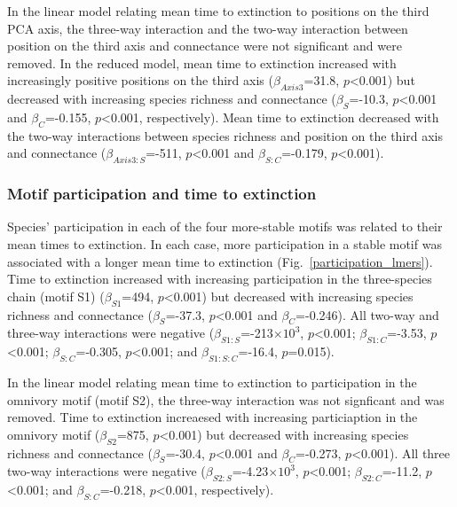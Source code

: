 \documentclass[12pt]{article}
\begin{document}
			In the linear model relating mean time to extinction to positions on the third PCA axis, the three-way interaction and the two-way interaction between position on the third axis and connectance were not significant and were removed. In the reduced model, mean time to extinction increased with increasingly positive positions on the third axis ($\beta_{Axis3}$=31.8, $p$\textless0.001) but decreased with increasing species richness and connectance ($\beta_{S}$=-10.3, $p$\textless0.001 and $\beta_{C}$=-0.155, $p$\textless0.001, respectively). Mean time to extinction decreased with the two-way interactions between species richness and position on the third axis and connectance ($\beta_{Axis3:S}$=-511, $p$\textless0.001 and $\beta_{S:C}$=-0.179, $p$\textless0.001).


		\subsubsection*{Motif participation and time to extinction}

			Species' participation in each of the four more-stable motifs was related to their mean times to extinction. In each case, more participation in a stable motif was associated with a longer mean time to extinction (Fig.~\ref{participation_lmers}).
			Time to extinction increased with increasing participation in the three-species chain (motif S1) ($\beta_{S1}$=494, $p$\textless0.001) but decreased with increasing species richness and connectance ($\beta_{S}$=-37.3, $p$\textless0.001 and $\beta_{C}$=-0.246). All two-way and three-way interactions were negative ($\beta_{S1:S}$=-213$\times10^3$, $p$\textless0.001; $\beta_{S1:C}$=-3.53, $p$\textless0.001; $\beta_{S:C}$=-0.305, $p$\textless0.001; and $\beta_{S1:S:C}$=-16.4, $p$=0.015). 


			In the linear model relating mean time to extinction to participation in the omnivory motif (motif S2), the three-way interaction was not signficant and was removed. Time to extinction increaesed with increasing particiaption in the omnivory motif ($\beta_{S2}$=875, $p$\textless0.001) but decreased with increasing species richness and connectance ($\beta_{S}$=-30.4, $p$\textless0.001 and $\beta_{C}$=-0.273, $p$\textless0.001). All three two-way interactions were negative ($\beta_{S2:S}$=-4.23$\times10^3$, $p$\textless0.001; $\beta_{S2:C}$=-11.2, $p$\textless0.001; and $\beta_{S:C}$=-0.218, $p$\textless0.001, respectively).
			
\end{document}
